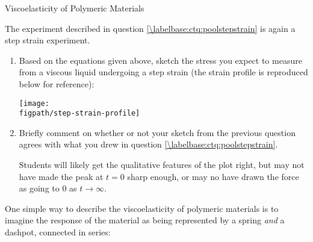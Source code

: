 \begin{activity}{Viscoelasticity of Polymeric Materials}
\begin{infobox}
\end{infobox}

\clearpage
\begin{ctqs}

	\question The experiment described in question \ref{\labelbase:ctq:poolstepstrain} is again a step strain experiment.
	
		\begin{enumerate}
			\item Based on the equations given above, sketch the stress you expect to measure from a viscous liquid undergoing a step strain (the strain profile is reproduced below for reference):
			
				\begin{solution}[3.5in]
					\vspace{6pt}
					\centerline{\texttt{[image: \\figpath/step-strain-profile]}}
					\vspace{6pt}
				\end{solution}
				
			\item Briefly comment on whether or not your sketch from the previous question agrees with what you drew in question \ref{\labelbase:ctq:poolstepstrain}.
			
				\begin{solution}[1in]
					Students will likely get the qualitative features of the plot right, but may not have made the peak at $t=0$ sharp enough, or may no have drawn the force as going to $0$ as $t\to\infty$.
				\end{solution}
		\end{enumerate}
\end{ctqs}
	
\clearpage
\begin{model}
\label{\labelbase:mdl:maxwell}

	One simple way to describe the viscoelasticity of polymeric materials is to imagine the response of the material as being represented by a spring \emph{and} a dashpot, connected in series:
	

\end{model}
\end{activity}
